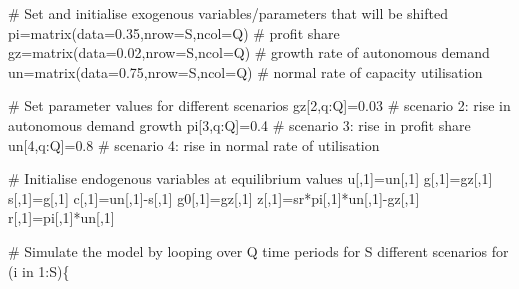 \documentclass[
  letterpaper,
  DIV=11,
  numbers=noendperiod]{scrreprt}
\newenvironment{Shaded}{\begin{snugshade}}{\end{snugshade}}
\newcommand{\AttributeTok}[1]{\textcolor[rgb]{0.40,0.45,0.13}{#1}}
\newcommand{\CommentTok}[1]{\textcolor[rgb]{0.37,0.37,0.37}{#1}}
\newcommand{\ControlFlowTok}[1]{\textcolor[rgb]{0.00,0.23,0.31}{#1}}
\newcommand{\DecValTok}[1]{\textcolor[rgb]{0.68,0.00,0.00}{#1}}
\newcommand{\FloatTok}[1]{\textcolor[rgb]{0.68,0.00,0.00}{#1}}
\newcommand{\FunctionTok}[1]{\textcolor[rgb]{0.28,0.35,0.67}{#1}}
\newcommand{\NormalTok}[1]{\textcolor[rgb]{0.00,0.23,0.31}{#1}}
\newcommand{\OtherTok}[1]{\textcolor[rgb]{0.00,0.23,0.31}{#1}}
\newcommand{\SpecialCharTok}[1]{\textcolor[rgb]{0.37,0.37,0.37}{#1}}
\begin{document}
\begin{Shaded}
\begin{Highlighting}[]
\CommentTok{\# Set and initialise exogenous variables/parameters that will be shifted}
\NormalTok{pi}\OtherTok{=}\FunctionTok{matrix}\NormalTok{(}\AttributeTok{data=}\FloatTok{0.35}\NormalTok{,}\AttributeTok{nrow=}\NormalTok{S,}\AttributeTok{ncol=}\NormalTok{Q) }\CommentTok{\# profit share}
\NormalTok{gz}\OtherTok{=}\FunctionTok{matrix}\NormalTok{(}\AttributeTok{data=}\FloatTok{0.02}\NormalTok{,}\AttributeTok{nrow=}\NormalTok{S,}\AttributeTok{ncol=}\NormalTok{Q) }\CommentTok{\# growth rate of autonomous demand}
\NormalTok{un}\OtherTok{=}\FunctionTok{matrix}\NormalTok{(}\AttributeTok{data=}\FloatTok{0.75}\NormalTok{,}\AttributeTok{nrow=}\NormalTok{S,}\AttributeTok{ncol=}\NormalTok{Q)  }\CommentTok{\# normal rate of capacity utilisation}

\CommentTok{\# Set parameter values for different scenarios}
\NormalTok{gz[}\DecValTok{2}\NormalTok{,q}\SpecialCharTok{:}\NormalTok{Q]}\OtherTok{=}\FloatTok{0.03} \CommentTok{\# scenario 2: rise in autonomous demand growth}
\NormalTok{pi[}\DecValTok{3}\NormalTok{,q}\SpecialCharTok{:}\NormalTok{Q]}\OtherTok{=}\FloatTok{0.4} \CommentTok{\# scenario 3: rise in profit share}
\NormalTok{un[}\DecValTok{4}\NormalTok{,q}\SpecialCharTok{:}\NormalTok{Q]}\OtherTok{=}\FloatTok{0.8} \CommentTok{\# scenario 4: rise in normal rate of utilisation}

\CommentTok{\# Initialise endogenous variables at equilibrium values}
\NormalTok{u[,}\DecValTok{1}\NormalTok{]}\OtherTok{=}\NormalTok{un[,}\DecValTok{1}\NormalTok{]}
\NormalTok{g[,}\DecValTok{1}\NormalTok{]}\OtherTok{=}\NormalTok{gz[,}\DecValTok{1}\NormalTok{]}
\NormalTok{s[,}\DecValTok{1}\NormalTok{]}\OtherTok{=}\NormalTok{g[,}\DecValTok{1}\NormalTok{]}
\NormalTok{c[,}\DecValTok{1}\NormalTok{]}\OtherTok{=}\NormalTok{un[,}\DecValTok{1}\NormalTok{]}\SpecialCharTok{{-}}\NormalTok{s[,}\DecValTok{1}\NormalTok{]}
\NormalTok{g0[,}\DecValTok{1}\NormalTok{]}\OtherTok{=}\NormalTok{gz[,}\DecValTok{1}\NormalTok{]}
\NormalTok{z[,}\DecValTok{1}\NormalTok{]}\OtherTok{=}\NormalTok{sr}\SpecialCharTok{*}\NormalTok{pi[,}\DecValTok{1}\NormalTok{]}\SpecialCharTok{*}\NormalTok{un[,}\DecValTok{1}\NormalTok{]}\SpecialCharTok{{-}}\NormalTok{gz[,}\DecValTok{1}\NormalTok{]}
\NormalTok{r[,}\DecValTok{1}\NormalTok{]}\OtherTok{=}\NormalTok{pi[,}\DecValTok{1}\NormalTok{]}\SpecialCharTok{*}\NormalTok{un[,}\DecValTok{1}\NormalTok{]}

\CommentTok{\# Simulate the model by looping over Q time periods for S different scenarios}
\ControlFlowTok{for}\NormalTok{ (i }\ControlFlowTok{in} \DecValTok{1}\SpecialCharTok{:}\NormalTok{S)\{}
    

\end{Highlighting}
\end{Shaded}
\end{document}
